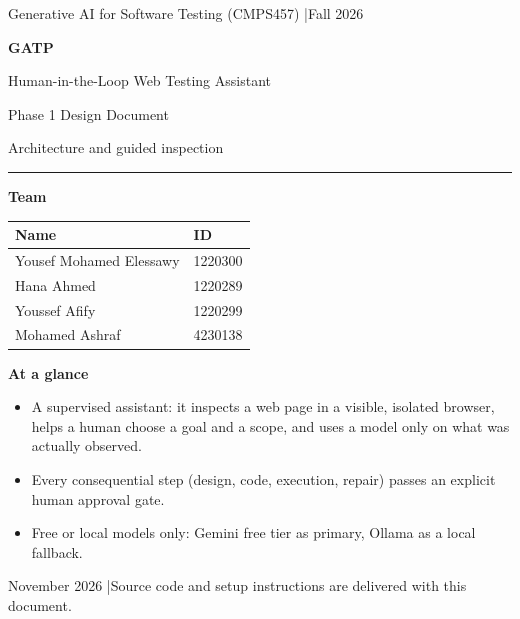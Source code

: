 \documentclass[11pt,a4paper]{article}
\begin{document}
\begin{titlepage}
\thispagestyle{empty}
\vspace*{2.2cm}
{\color{muted}\large Generative AI for Software Testing (CMPS457) \quad|\quad Fall 2026}\par
\vspace{0.6cm}
{\fontsize{34}{40}\selectfont\bfseries\color{accent} GATP}\par
\vspace{0.2cm}
{\LARGE Human-in-the-Loop Web Testing Assistant}\par
\vspace{0.5cm}
{\Large Phase 1 Design Document}\par
{\large\color{muted} Architecture and guided inspection}\par
\vspace{0.4cm}
{\color{rule}\rule{\linewidth}{0.8pt}}\par
\vspace{1.2cm}

{\large\bfseries Team}\par
\vspace{4pt}
\begin{tabular}{@{}L{7.5cm}L{3cm}@{}}
\toprule
\textbf{Name} & \textbf{ID} \\
\midrule
Yousef Mohamed Elessawy & 1220300 \\
Hana Ahmed & 1220289 \\
Youssef Afify & 1220299 \\
Mohamed Ashraf & 4230138 \\
\bottomrule
\end{tabular}

\vspace{1.2cm}
{\large\bfseries At a glance}\par
\vspace{2pt}
\begin{itemize}
  \item A supervised assistant: it inspects a web page in a visible, isolated browser, helps a human choose a goal and a scope, and uses a model only on what was actually observed.
  \item Every consequential step (design, code, execution, repair) passes an explicit human approval gate.
  \item Free or local models only: Gemini free tier as primary, Ollama as a local fallback.
\end{itemize}

\vfill
{\small\color{muted} November 2026 \quad|\quad Source code and setup instructions are delivered with this document.}
\end{titlepage}
\end{document}
